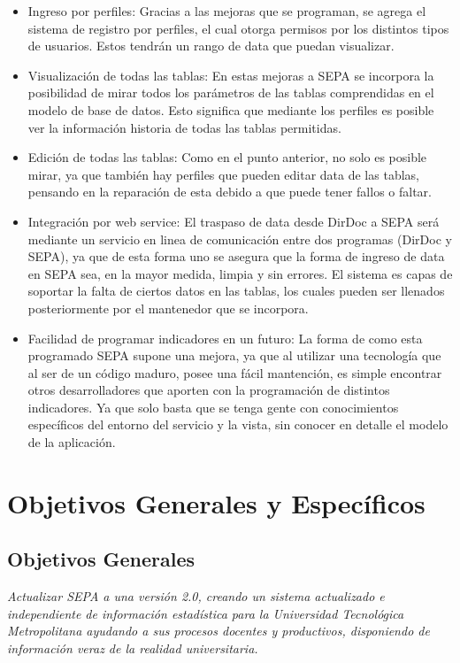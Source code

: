 \documentclass[a4paper,12pt,openany,oneside]{book}
\begin{document}
\begin{itemize}
	\item Ingreso por perfiles: Gracias a las mejoras que se programan, se agrega el sistema de registro por perfiles, el cual otorga permisos por los distintos tipos de usuarios. Estos tendrán un rango de data que puedan visualizar. 
	\item Visualización de todas las tablas: En estas mejoras a SEPA se incorpora la posibilidad de mirar todos los parámetros de las tablas comprendidas en el modelo de base de datos. Esto significa que mediante los perfiles es posible ver la información historia de todas las tablas permitidas.
	\item Edición de todas las tablas: Como en el punto anterior, no solo es posible mirar, ya que también hay perfiles que pueden editar data de las tablas, pensando en la reparación de esta debido a que puede tener fallos o faltar.
	\item Integración por web service: El traspaso de data desde DirDoc a SEPA será mediante un servicio en linea de comunicación entre dos programas (DirDoc y SEPA), ya que de esta forma uno se asegura que la forma de ingreso de data en SEPA sea, en la mayor medida, limpia y sin errores. El sistema es capas de soportar la falta de ciertos datos en las tablas, los cuales pueden ser llenados posteriormente por el mantenedor que se incorpora.
	\item Facilidad de programar indicadores en un futuro: La forma de como esta programado SEPA supone una mejora, ya que al utilizar una tecnología que al ser de un código maduro, posee una fácil mantención, es simple encontrar otros desarrolladores que aporten con la programación de distintos indicadores. Ya que solo basta que se tenga gente con conocimientos específicos del entorno del servicio y la vista, sin conocer en detalle el modelo de la aplicación.
\end{itemize}
\section{Objetivos Generales y Específicos}
\subsection{Objetivos Generales}
\textit{Actualizar SEPA a una versión 2.0, creando un sistema actualizado e independiente de información estadística para la Universidad Tecnológica Metropolitana ayudando a sus procesos docentes y productivos, disponiendo de información veraz de la realidad universitaria.}
\end{document}
